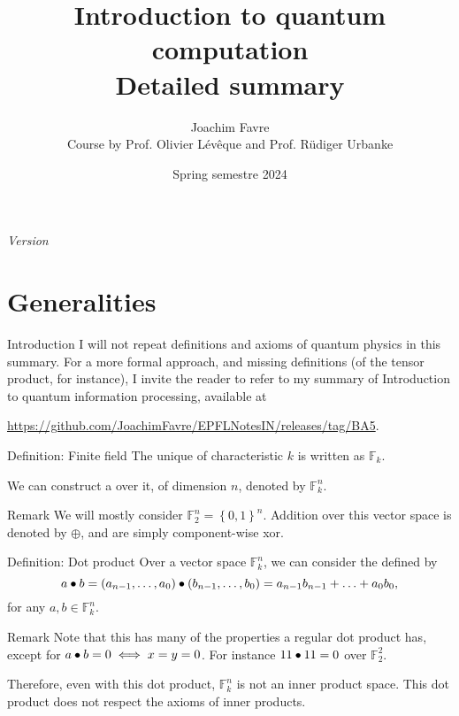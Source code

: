 \documentclass[a4paper]{article}
\title{Introduction to quantum computation \\ Detailed summary}
\author{Joachim Favre \\ Course by Prof. Olivier Lévêque and Prof. Rüdiger Urbanke}
\date{Spring semestre 2024}
\begin{document}
\maketitle

\setcounter{tocdepth}{5}

\tableofcontents

\initcurrdate
\def\setdateformat{Y--m--d}
\vspace*{\fill}
\begin{center}
    \textit{Version \printdate}
\end{center}
\vspace*{\fill}
\vspace*{\fill}
\newpage

\section{Generalities}

\begin{parag}{Introduction}
    I will not repeat definitions and axioms of quantum physics in this summary. For a more formal approach, and missing definitions (of the tensor product, for instance), I invite the reader to refer to my summary of Introduction to quantum information processing, available at
    \begin{center}
        \url{https://github.com/JoachimFavre/EPFLNotesIN/releases/tag/BA5}.
    \end{center}
\end{parag}

\begin{parag}{Definition: Finite field}
    The unique  of characteristic $k$ is written as $\mathbb{F}_{k}$.

    We can construct a  over it, of dimension $n$, denoted by $\mathbb{F}_k^n$.

    \begin{subparag}{Remark}
        We will mostly consider $\mathbb{F}_{2}^n = \left\{0, 1\right\}^n$. Addition over this vector space is denoted by $\oplus$, and are simply component-wise xor.
    \end{subparag}
\end{parag}

\begin{parag}{Definition: Dot product}
    Over a vector space $\mathbb{F}_k^n$, we can consider the  defined by
    \[a \dotprod b = \left(a_{n-1}, \ldots, a_{0}\right) \dotprod \left(b_{n-1}, \ldots, b_0\right) = a_{n-1} b_{n-1} + \ldots + a_0 b_0,\]
    for any $a, b \in \mathbb{F}_{k}^n$.

    \begin{subparag}{Remark}
        Note that this has many of the properties a regular dot product has, except for $a \bullet b = 0 \iff x = y = 0$. For instance $11 \bullet 11 = 0$ over $\mathbb{F}_2^2$. 

        Therefore, even with this dot product, $\mathbb{F}_k^n$ is not an inner product space. This dot product does not respect the axioms of inner products.
    \end{subparag}
\end{parag}
\end{document}
